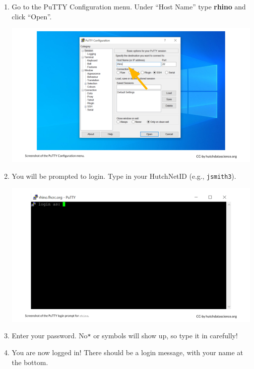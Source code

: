 \documentclass[
]{book}
\begin{document}
\begin{enumerate}
\def\labelenumi{\arabic{enumi}.}
\item
  Go to the PuTTY Configuration menu. Under ``Host Name'' type \textbf{rhino} and click ``Open''.

  \includegraphics[width=1\linewidth]{resources/images/04-logging-in_files/figure-latex//1BQxrVYdKZTbpCaF-i_q9w7s9x034lEXpQZDU-Sl09cs_g15643d101eb_4_41}
\item
  You will be prompted to login. Type in your HutchNetID (e.g., \texttt{jsmith3}).

  \includegraphics[width=1\linewidth]{resources/images/04-logging-in_files/figure-latex//1BQxrVYdKZTbpCaF-i_q9w7s9x034lEXpQZDU-Sl09cs_g15643d101eb_4_48}
\item
  Enter your password. No\texttt{*} or symbols will show up, so type it in carefully!
\item
  You are now logged in! There should be a login message, with your name at the bottom.


\end{enumerate}
\end{document}
